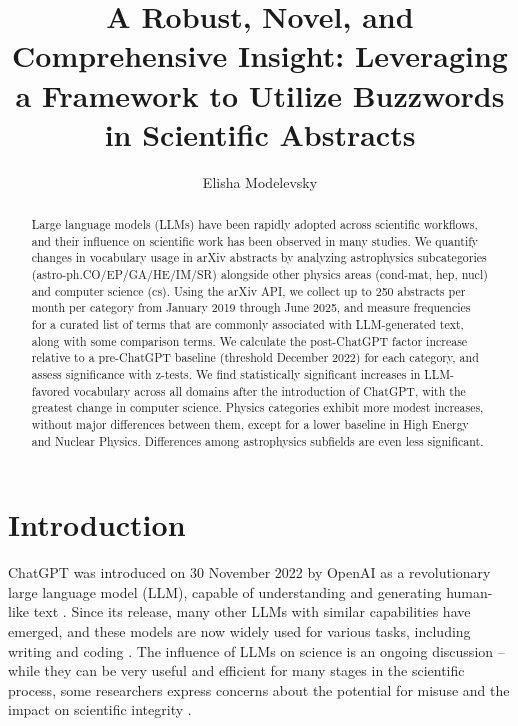 \documentclass[twocolumn]{aastex701}
\begin{document}
\title{A Robust, Novel, and Comprehensive Insight: Leveraging a Framework to Utilize Buzzwords in Scientific Abstracts}

\author[orcid=0000-0003-4105-3443]{Elisha Modelevsky}

\begin{abstract}

Large language models (LLMs) have been rapidly adopted across scientific workflows, and their influence on scientific work has been observed in many studies.
We quantify changes in vocabulary usage in arXiv abstracts by analyzing astrophysics subcategories (astro-ph.CO/EP/GA/HE/IM/SR) alongside other physics areas (cond-mat, hep, nucl) and computer science (cs).
Using the arXiv API, we collect up to 250 abstracts per month per category from January 2019 through June 2025, and measure frequencies for a curated list of terms that are commonly associated with LLM-generated text, along with some comparison terms.
We calculate the post-ChatGPT factor increase relative to a pre-ChatGPT baseline (threshold December 2022) for each category, and assess significance with z-tests.
We find statistically significant increases in LLM-favored vocabulary across all domains after the introduction of ChatGPT, with the greatest change in computer science.
Physics categories exhibit more modest increases, without major differences between them, except for a lower baseline in High Energy and Nuclear Physics.
Differences among astrophysics subfields are even less significant.


\end{abstract}


\section{Introduction} 

ChatGPT was introduced on 30 November 2022 by OpenAI as a revolutionary large language model (LLM), capable of understanding and generating human-like text \citep{Roumeliotis2023}.
Since its release, many other LLMs with similar capabilities have emerged, and these models are now widely used for various tasks, including writing and coding \citep{Minaee2024}.
The influence of LLMs on science is an ongoing discussion -- while they can be very useful and efficient for many stages in the scientific process, some researchers express concerns about the potential for misuse and the impact on scientific integrity \citep{Zhang2025}.
\end{document}
